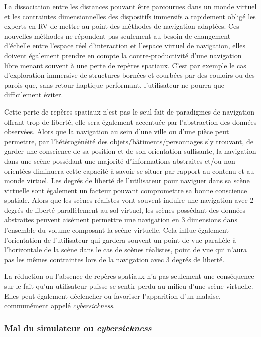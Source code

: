 La dissociation entre les distances pouvant être parcourues dans un monde virtuel et les contraintes dimensionnelles des dispositifs immersifs a rapidement obligé les experts en RV de mettre au point des méthodes de navigation adaptées. Ces nouvelles méthodes ne répondent pas seulement au besoin de changement d'échelle entre l'espace réel d'interaction et l'espace virtuel de navigation, elles doivent également prendre en compte la contre-productivité d'une navigation libre menant souvent à une perte de repères spatiaux. C'est par exemple le cas d'exploration immersive de structures bornées et courbées par des couloirs ou des parois que, sans retour haptique performant, l'utilisateur ne pourra que difficilement éviter. 

Cette perte de repères spatiaux n'est pas le seul fait de paradigmes de navigation offrant trop de liberté, elle sera également accentuée par l'abstraction des données observées. Alors que la navigation au sein d'une ville ou d'une pièce peut permettre, par l'hétérogénéité des objets/bâtiments/personnages s'y trouvant, de garder une conscience de sa position et de son orientation suffisante, la navigation dans une scène possédant une majorité d'informations abstraites et/ou non orientées diminuera cette capacité à savoir se situer par rapport au contenu et au monde virtuel. Les degrés de liberté de l'utilisateur pour naviguer dans sa scène virtuelle sont également un facteur pouvant compromettre sa bonne conscience spatiale. Alors que les scènes réalistes vont souvent induire une navigation avec 2 degrés de liberté parallèlement au sol virtuel, les scènes possédant des données abstraites peuvent aisément permettre une navigation en 3 dimensions dans l'ensemble du volume composant la scène virtuelle. Cela influe également l'orientation de l'utilisateur qui gardera souvent un point de vue parallèle à l'horizontale de la scène dans le cas de scènes réalistes, point de vue qui n'aura pas les mêmes contraintes lors de la navigation avec 3 degrés de liberté.

La réduction ou l'absence de repères spatiaux n'a pas seulement une conséquence sur le fait qu'un utilisateur puisse se sentir perdu au milieu d'une scène virtuelle. Elles peut également déclencher ou favoriser l'apparition d'un malaise, communément appelé \textit{cybersickness}. 

\subsubsection{Mal du simulateur ou \textit{cybersickness}} \label{cybersickness}

